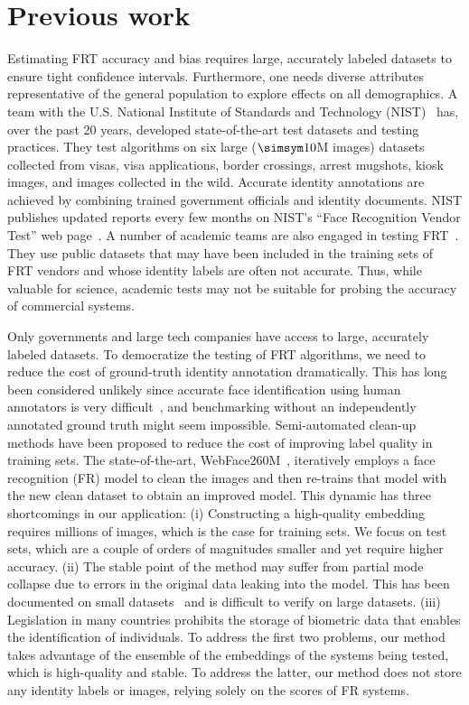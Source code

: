 \section{Previous work}
\label{sec:previous-work}

Estimating FRT accuracy and bias requires large, accurately labeled datasets to ensure tight confidence intervals. Furthermore, one needs diverse attributes representative of the general population to explore effects on all demographics.  A team with the U.S. National Institute of Standards and Technology (NIST)~\cite{grother2014face,grother2019face} has, over the past 20 years, developed state-of-the-art test datasets and testing practices. They test algorithms on six large ($\simsym 10$M images) datasets collected from visas, visa applications, border crossings, arrest mugshots, kiosk images, and images collected in the wild. Accurate identity annotations are achieved by combining trained government officials and identity documents. NIST publishes updated reports every few months on  NIST's  ``Face Recognition Vendor Test'' web page~\cite{nist_frvt}. A number of academic teams are also engaged in testing FRT~\cite{albiero2020analysis,albiero2020does,albiero2021gendered,krishnapriya2020issues}. They use public datasets that may have been included in the training sets of FRT vendors and whose identity labels are often not accurate. Thus, while valuable for science, academic tests may not be suitable for probing the accuracy of commercial systems.

Only governments and large tech companies have access to large, accurately labeled datasets. 
To democratize the testing of FRT algorithms, we need to reduce the cost of ground-truth identity annotation dramatically.
This has long been considered unlikely since accurate face identification using human annotators is very difficult~\cite{phillips2018face}, and benchmarking without an independently annotated ground truth might seem impossible. Semi-automated clean-up methods have been proposed to reduce the cost of improving label quality in training sets. The state-of-the-art, WebFace260M~\cite{webface260}, iteratively employs a face recognition (FR) model to clean the images and then re-trains that model with the new clean dataset to obtain an improved model. This dynamic has three shortcomings in our application: (i) Constructing a high-quality embedding requires millions of images, which is the case for training sets. We focus on test sets, which are a couple of orders of magnitudes smaller and yet require higher accuracy. (ii) The stable point of the method may suffer from partial mode collapse due to errors in the original data leaking into the model. This has been documented on small datasets~\cite{shumailov2024ai} and is difficult to verify on large datasets. (iii) Legislation in many countries prohibits the storage of biometric data that enables the identification of individuals. To address the first two problems, our method takes advantage of the ensemble of the embeddings of the systems being tested, which is high-quality and stable. To address the latter, our method does not store any identity labels or images, relying solely on the scores of FR systems.

